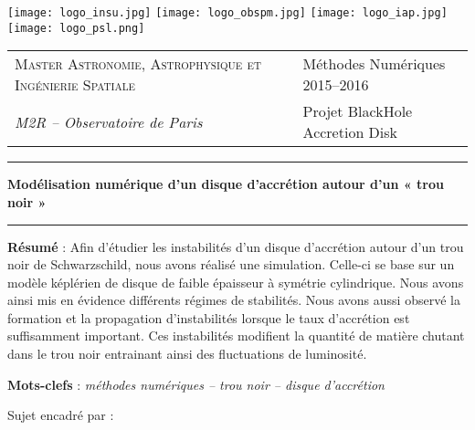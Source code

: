 \thispagestyle{empty}

\texttt{[image: logo\_insu.jpg]} \hfill
\texttt{[image: logo\_obspm.jpg]} \hfill
\texttt{[image: logo\_iap.jpg]} \hfill
\texttt{[image: logo\_psl.png]}
 
\vspace{0.5cm}

\begin{tabularx}{\textwidth}{@{} l X l @{}}
\textsc{Master Astronomie, Astrophysique et Ingénierie Spatiale} & & Méthodes Numériques 2015–2016 \\
\textit{M2R – Observatoire de Paris} & & Projet BlackHole Accretion Disk
\end{tabularx}
 
\begin{center}
 
\vspace{1.5cm}
 
\rule[11pt]{5cm}{0.5pt}
 
\textbf{\huge Modélisation numérique d’un disque d’accrétion autour d’un « trou noir »}

\rule{5cm}{0.5pt}

\vspace{1.5cm}


\parbox{15cm}{\textbf{Résumé} : Afin d'étudier les instabilités d'un disque d'accrétion autour d'un trou noir de Schwarzschild, nous avons réalisé une simulation. Celle-ci se base sur un modèle képlérien de disque de faible épaisseur à symétrie cylindrique. Nous avons ainsi mis en évidence différents régimes de stabilités. Nous avons aussi observé la formation et la propagation d'instabilités lorsque le taux d'accrétion est suffisamment important. Ces instabilités modifient la quantité de matière chutant dans le trou noir entrainant ainsi des fluctuations de luminosité.
} %

\vspace{0.5cm}

\parbox{15cm}{
\textbf{Mots-clefs} : \it méthodes numériques – trou noir – disque d’accrétion
} %

\vspace{0.5cm}

\parbox{15cm}{
Sujet encadré par :

}
\end{center}
